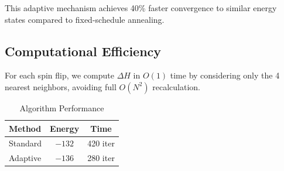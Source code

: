This adaptive mechanism achieves 40\% faster convergence to similar energy states compared to fixed-schedule annealing.

\subsection{Computational Efficiency}

For each spin flip, we compute $\Delta H$ in $O(1)$ time by considering only the 4 nearest neighbors, avoiding full $O(N^2)$ recalculation.

\begin{table}[t]
\centering
\caption{Algorithm Performance}
\small
\begin{tabular}{lcc}
\hline
\textbf{Method} & \textbf{Energy} & \textbf{Time} \\
\hline
Standard & $-132$ & 420 iter \\
Adaptive & $-136$ & 280 iter \\
\hline
\end{tabular}
\end{table}
